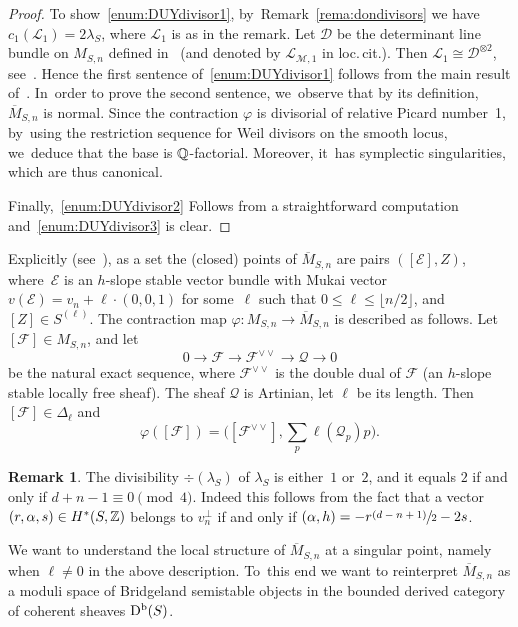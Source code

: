 \documentclass[11pt]{article}
\newcommand{\psfrac}[2]{\sfrac{(#1)}{#2}}
\newcommand\cD{\mathcal{D}}
\newcommand\cE{\mathcal{E}}
\newcommand\cF{\mathcal{F}}
\newcommand\cL{\mathcal{L}}
\newcommand\cM{\mathcal{M}}
\newcommand\cQ{\mathcal{Q}}
\DeclareMathOperator{\Db}{D^{\textup b}}
\let\phi\varphi
\theoremstyle{definition}
\newtheorem{rema}[lemm]{Remark}
\begin{document}
\begin{proof}
To show~\eqref{enum:DUYdivisor1}, by~Remark~\ref{rema:dondivisors} we have $c_1(\cL_1)=2\lambda_S$, where $\cL_1$ is as in the remark.
Let $\cD$ be the determinant line bundle on $M_{S,n}$ defined in~\cite{Li:uhlencomp} (and denoted by $\cL_{\cM,1}$ in loc.\,cit.).
Then $\cL_1\cong \cD^{\otimes 2}$, see~\cite[Lem.\,8.3.4]{HL:moduli}. Hence the first sentence of~\eqref{enum:DUYdivisor1} follows from the main result of~\cite{Li:uhlencomp}. In~order to prove the second sentence, we~observe that by its definition, $\overline{M}_{S,n}$ is normal.
Since the contraction $\varphi$ is divisorial of relative Picard number~1, by~using the restriction sequence for Weil divisors on the smooth locus, we~deduce that the base is ${\mathbb Q}$-factorial.
Moreover, it~has symplectic singularities, which are thus canonical.

Finally,~\eqref{enum:DUYdivisor2} Follows from a straightforward computation and~\eqref{enum:DUYdivisor3} is clear.
\end{proof}

Explicitly (see~\cite{Li:uhlencomp}), as a set the (closed) points of $\overline{M}_{S,n}$ are pairs $([\cE],Z)$, where~$\cE$ is an $h$-slope stable vector bundle with Mukai vector $v(\cE)=v_n+\ell\cdot(0,0,1)$ for some~$\ell$ such that $0\le \ell\le \lfloor n/2\rfloor$, and $[Z]\in S^{(\ell)}$.
The contraction map $\phi\colon M_{S,n}\to \overline{M}_{S,n}$ is described as follows.
Let $[\cF]\in M_{S,n}$, and let
\[
0\to \cF\to \cF^{\vee\vee}\to \cQ\to 0
\]
be the natural exact sequence, where $\cF^{\vee\vee}$ is the double dual of $\cF$ (an $h$-slope stable locally free sheaf).
The sheaf $\cQ$ is Artinian, let $\ell$ be its length.
Then $[\cF]\in\Delta_{\ell}$ and
\[\textstyle
\varphi([\cF])=\bigl([\cF^{\vee\vee}],\sum_{p}\ell(\cQ_p)p\bigr).
\]

\begin{rema}\label{rmk:divisibility}
The divisibility $\div(\lambda_S)$ of $\lambda_S$ is either~$1$ or~$2$, and it equals $2$ if and only if $d+n-1\equiv 0 \pmod 4$.
Indeed this follows from the fact that a vector $(r,\alpha,s)\in H^*(S,{\mathbb Z})$ belongs to $v_n^\perp$ if and only if $(\alpha,h)=-r\psfrac{d-n+1}{2}-2s$.
\end{rema}

We want to understand the local structure of $\overline{M}_{S,n}$ at a singular point, namely when $\ell\neq0$ in the above description. To~this end we want to reinterpret $\overline{M}_{S,n}$ as a moduli space of Bridgeland semistable objects in the bounded derived category of coherent sheaves $\Db(S)$.
\end{document}
